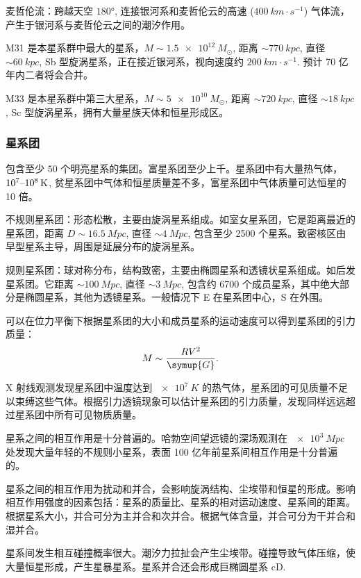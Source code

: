 \documentclass[../天体物理基础.tex]{subfiles}
\begin{document}
麦哲伦流：跨越天空 $\ang{180;;}$, 连接银河系和麦哲伦云的高速 ($\qty{400}{km\cdot{}s^{-1}}$) 气体流，产生于银河系与麦哲伦云之间的潮汐作用。

M31 是本星系群中最大的星系，$M\sim\qty{1.5e12}{M_{\odot}}$, 距离 $\sim\qty{770}{kpc}$, 直径 $\sim\qty{60}{kpc}$, Sb 型旋涡星系，正在接近银河系，视向速度约 $\qty{200}{km\cdot{}s^{-1}}$. 预计 70 亿年内二者将会合并。

M33 是本星系群中第三大星系，$M\sim\qty{5e10}{M_{\odot}}$, 距离 $\sim\qty{720}{kpc}$, 直径 $\sim\qty{18}{kpc}$, Sc 型旋涡星系，拥有大量星族\uppercase\expandafter{}天体和恒星形成区。

\subsubsection{星系团}
包含至少 $50$ 个明亮星系的集团。富星系团至少上千。星系团中有大量热气体，$10^{7}\text{\textendash}\qty{e8}{K}$, 贫星系团中气体和恒星质量差不多，富星系团中气体质量可达恒星的 10 倍。

不规则星系团：形态松散，主要由旋涡星系组成。如室女星系团，它是距离最近的星系团，距离 $D\sim\qty{16.5}{Mpc}$, 直径 $\sim\qty{4}{Mpc}$, 包含至少 2500 个星系。致密核区由早型星系主导，周围是延展分布的旋涡星系。

规则星系团：球对称分布，结构致密，主要由椭圆星系和透镜状星系组成。如后发星系团。它距离 $\sim\qty{100}{Mpc}$, 直径 $\sim\qty{3}{Mpc}$, 包含约 6700 个成员星系，其中绝大部分是椭圆星系，其他为透镜星系。一般情况下 E 在星系团中心，S 在外围。

可以在位力平衡下根据星系团的大小和成员星系的运动速度可以得到星系团的引力质量：
\begin{equation}
M\sim\frac{RV^{2}}{\symup{G}}.
\end{equation}

X 射线观测发现星系团中温度达到 $\qty{e7}{K}$ 的热气体，星系团的可见质量不足以束缚这些气体。根据引力透镜现象可以估计星系团的引力质量，发现同样远远超过星系团中所有可见物质质量。

星系之间的相互作用是十分普遍的。哈勃空间望远镜的深场观测在 $\qty{e3}{Mpc}$ 处发现大量年轻的不规则小星系，表面 100 亿年前星系间相互作用是十分普遍的。

星系之间的相互作用为扰动和并合，会影响旋涡结构、尘埃带和恒星的形成。影响相互作用强度的因素包括：星系的质量比、星系的相对运动速度、星系间的距离。根据星系大小，并合可分为主并合和次并合。根据气体含量，并合可分为干并合和湿并合。

星系间发生相互碰撞概率很大。潮汐力拉扯会产生尘埃带。碰撞导致气体压缩，使大量恒星形成，产生星暴星系。星系并合还会形成巨椭圆星系 cD.
\end{document}
